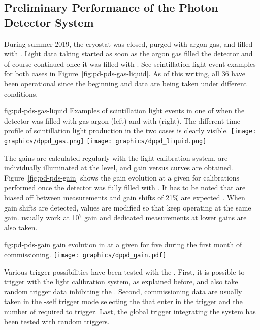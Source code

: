 \subsection{Preliminary Performance of the  Photon Detector System}

During summer 2019, the  cryostat was closed, purged with argon gas, and filled with . Light data taking started %
as soon as the argon gas filled the detector and of course continued once it was filled with  . See scintillation light event examples for both cases in Figure~\ref{fig:pd-pds-gas-liquid}. As of this writing, all 36  have been operational since the beginning and data are being taken under different conditions.

\begin{dunefigure}{fig:pd-pds-gas-liquid} {Examples of scintillation light events in one  of  when the detector was filled with gas argon (left) and with  (right). The different time profile of scintillation light production in the two cases is clearly visible.}
\texttt{[image: graphics/dppd\_gas.png]}
\texttt{[image: graphics/dppd\_liquid.png]}
\end{dunefigure}

The  gains are calculated regularly with the light calibration system.  are individually illuminated at the  level, and gain versus   curves are obtained. Figure~\ref{fig:pd-pds-gain} shows the gain evolution at a given  for calibrations performed once the detector was fully filled with . It has to be noted that  are biased off between measurements and gain shifts of 21\% are expected \cite{Belver:2018erf}. When gain shifts are detected,  values are modified so that  keep operating at the same gain.  usually work at 10$^7$ gain and dedicated measurements at lower gains are also taken.

\begin{dunefigure}{fig:pd-pds-gain} { gain evolution in  at a given  for five  during the first month of commissioning.}
\texttt{[image: graphics/dppd\_gain.pdf]}
\end{dunefigure}

Various trigger possibilities have been tested with the  . First, it is possible to trigger with the light calibration system, as explained before, and also take random trigger data inhibiting the . Second, commissioning data are usually taken in the -self trigger mode selecting the  that enter in the trigger and the number of  required to trigger. Last, the global  trigger integrating the  system has been tested with random triggers.

